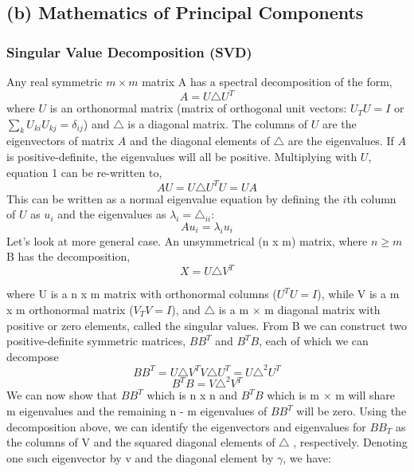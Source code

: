 \documentclass[12pt,twoside]{article}
\begin{document}
\subsection{(b) Mathematics of Principal Components}

\subsubsection{Singular Value Decomposition (SVD)}
\bigbreak
Any real symmetric $m \times m$ matrix A has a spectral decomposition of the form,
\begin{equation}
A = U\triangle U^{T}
\end{equation}
\bigbreak
where $U$ is an orthonormal matrix (matrix of orthogonal unit vectors: $U_{T}U = I$ or $\sum_{k}U_{ki}U_{kj} = \delta_{ij}$) and $\triangle$ is a diagonal matrix. The columns of $U$ are the eigenvectors of matrix $A$ and the diagonal elements of $\triangle$ are the eigenvalues. If $A$ is positive-definite, the eigenvalues will all be positive. Multiplying with $U$, equation 1 can be re-written to,
\begin{equation}
AU = U\triangle U^{T}U = UA
\end{equation}
\bigbreak
This can be written as a normal eigenvalue equation by defining the $i$th column of $U$ as
$u_{i}$ and the eigenvalues as $\lambda_{i} = \triangle_{ii}$:
\begin{equation}
Au_{i} = \lambda_{i}u_{i}
\end{equation}
\bigbreak
Let's look at more general case. An unsymmetrical (n x m) matrix, where $n \geq m$ B has the decomposition,
\begin{equation}
X = U\triangle V^{T}
\end{equation}

where U is a n x m matrix with orthonormal columns ($U^{T}U = I$), while V is a m x m orthonormal matrix ($V_{T}V = I$), and $\triangle$ is a m × m diagonal matrix with positive or zero elements, called the singular values.
\bigbreak
From B we can construct two positive-definite symmetric matrices, $BB^{T}$ and $B^{T}B$, each of which we can decompose
\begin{equation}
BB^{T} = U\triangle V^{T}V\triangle U^{T} = U\triangle^2U^{T}
\end{equation}
\begin{equation}
B^{T}B = V\triangle^2V^{T}
\end{equation}
\bigbreak
We can now show that $BB^{T}$ which is n x n and $B^{T}B$ which is m × m will share m eigenvalues and the remaining n - m eigenvalues of $BB^{T} $ will be zero.
\bigbreak
Using the decomposition above, we can identify the eigenvectors and eigenvalues for $BB_{T}$ as the columns of V and the squared diagonal elements of $\triangle$ , respectively. Denoting one such eigenvector by v and the diagonal element by $\gamma$, we have:
\end{document}
